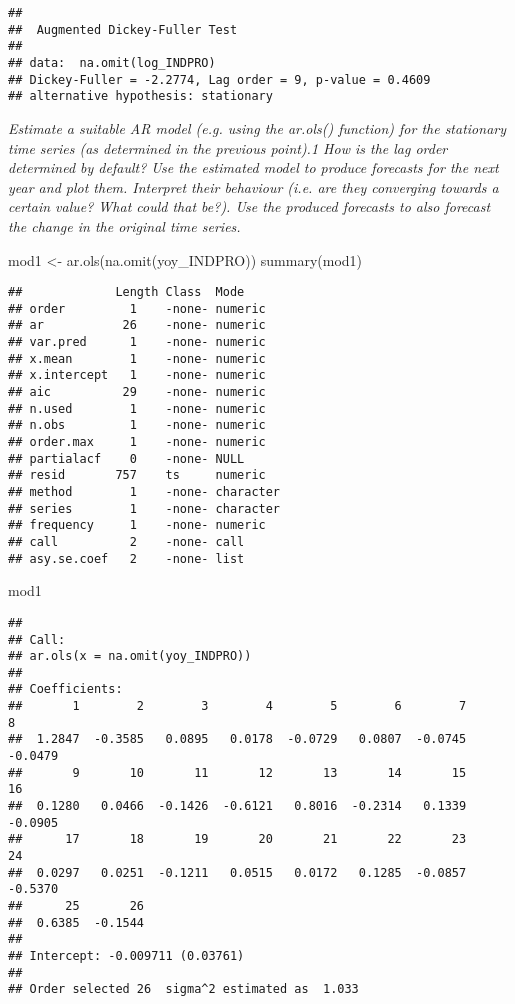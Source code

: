 \documentclass[
]{article}
\newenvironment{Shaded}{\begin{snugshade}}{\end{snugshade}}
\newcommand{\FunctionTok}[1]{\textcolor[rgb]{0.00,0.00,0.00}{#1}}
\newcommand{\NormalTok}[1]{#1}
\newcommand{\OtherTok}[1]{\textcolor[rgb]{0.56,0.35,0.01}{#1}}
\begin{document}
\begin{verbatim}
## 
##  Augmented Dickey-Fuller Test
## 
## data:  na.omit(log_INDPRO)
## Dickey-Fuller = -2.2774, Lag order = 9, p-value = 0.4609
## alternative hypothesis: stationary
\end{verbatim}

\textit{Estimate a suitable AR model (e.g. using the ar.ols() function) for the stationary time series (as determined in the previous point).1 How is the lag order determined by default? Use the estimated model to produce forecasts for the next year and plot them. Interpret their behaviour (i.e. are they converging towards a certain value? What could that be?). Use the produced forecasts to also forecast the change in the original time series.}

\begin{Shaded}
\begin{Highlighting}[]
\NormalTok{mod1 }\OtherTok{\textless{}{-}} \FunctionTok{ar.ols}\NormalTok{(}\FunctionTok{na.omit}\NormalTok{(yoy\_INDPRO))}
\FunctionTok{summary}\NormalTok{(mod1)}
\end{Highlighting}
\end{Shaded}

\begin{verbatim}
##             Length Class  Mode     
## order         1    -none- numeric  
## ar           26    -none- numeric  
## var.pred      1    -none- numeric  
## x.mean        1    -none- numeric  
## x.intercept   1    -none- numeric  
## aic          29    -none- numeric  
## n.used        1    -none- numeric  
## n.obs         1    -none- numeric  
## order.max     1    -none- numeric  
## partialacf    0    -none- NULL     
## resid       757    ts     numeric  
## method        1    -none- character
## series        1    -none- character
## frequency     1    -none- numeric  
## call          2    -none- call     
## asy.se.coef   2    -none- list
\end{verbatim}

\begin{Shaded}
\begin{Highlighting}[]
\NormalTok{mod1}
\end{Highlighting}
\end{Shaded}

\begin{verbatim}
## 
## Call:
## ar.ols(x = na.omit(yoy_INDPRO))
## 
## Coefficients:
##       1        2        3        4        5        6        7        8  
##  1.2847  -0.3585   0.0895   0.0178  -0.0729   0.0807  -0.0745  -0.0479  
##       9       10       11       12       13       14       15       16  
##  0.1280   0.0466  -0.1426  -0.6121   0.8016  -0.2314   0.1339  -0.0905  
##      17       18       19       20       21       22       23       24  
##  0.0297   0.0251  -0.1211   0.0515   0.0172   0.1285  -0.0857  -0.5370  
##      25       26  
##  0.6385  -0.1544  
## 
## Intercept: -0.009711 (0.03761) 
## 
## Order selected 26  sigma^2 estimated as  1.033
\end{verbatim}
\end{document}
